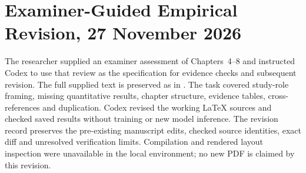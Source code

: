 \section{Examiner-Guided Empirical Revision, 27 November 2026}
The researcher supplied an examiner assessment of Chapters~4--8 and instructed Codex to
use that review as the specification for evidence checks and subsequent revision.
The full supplied text is preserved as  in
.
The task covered study-role framing, missing quantitative results, chapter structure,
evidence tables, cross-references and duplication. Codex revised the working LaTeX
sources and checked saved results without training or new model inference. The revision
record preserves the pre-existing manuscript edits, checked source identities, exact
diff and unresolved verification limits. Compilation and rendered layout inspection
were unavailable in the local environment; no new PDF is claimed by this revision.
